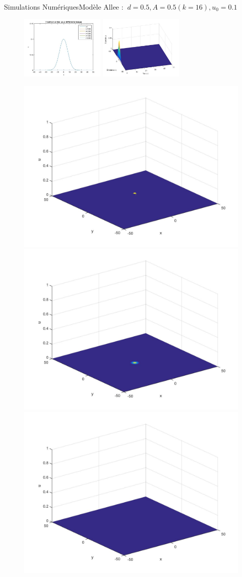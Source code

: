 \documentclass[10pt]{beamer}
\begin{document}
\begin{frame}{Simulations Numériques}{Modèle Allee :  $\ d=0.5, A=0.5 (k=16), u_0=0.1$}
\begin{figure}[H]
	\centering
	\includegraphics[width=0.40\linewidth, height=3cm]{Allee/F2331}\hfill
	\includegraphics[width=0.55\linewidth, height=3cm]{Allee/F4331}
\end{figure}
\begin{figure}[H]
	\centering
	\includegraphics[width=0.3\linewidth]{Allee/331__1_}\hfill
    \includegraphics[width=0.3\linewidth]{Allee/331__2_}\hfill
	\includegraphics[width=0.3\linewidth]{Allee/331__3_}
\end{figure}
\end{frame}
\end{document}
